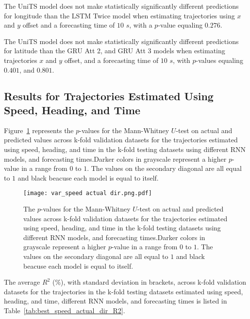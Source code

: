 The UniTS model does not make statistically significantly different predictions for longitude than the LSTM Twice model when estimating trajectories using $x$ and $y$ offset and a forecasting time of $10$ $s$, with a $p$-value equaling $0.276$.

The UniTS model does not make statistically significantly different predictions for latitude than the GRU Att 2, and GRU Att 3 models when estimating trajectories $x$ and $y$ offset, and a forecasting time of $10$ $s$, with $p$-values equaling $0.401$, and $0.801$.

\subsection{Results for Trajectories Estimated Using Speed, Heading, and Time}

Figure~\ref{fig:var_speed actual dir.png} represents the $p$-values for the Mann-Whitney $U$-test on actual and predicted values across k-fold validation datasets for the trajectories estimated using speed, heading, and time in the k-fold testing datasets using different RNN models, and forecasting times.Darker colors in grayscale represent a higher $p$-value in a range from $0$ to $1$. The values on the secondary diagonal are all equal to $1$ and black beacuse each model is equal to itself.

\begin{figure}[!ht]
	\centering
	\texttt{[image: var\_speed actual dir.png.pdf]}
	\caption{The $p$-values for the Mann-Whitney $U$-test on actual and predicted values across k-fold validation datasets for the trajectories estimated using speed, heading, and time in the k-fold testing datasets using different RNN models, and forecasting times.Darker colors in grayscale represent a higher $p$-value in a range from $0$ to $1$. The values on the secondary diagonal are all equal to $1$ and black beacuse each model is equal to itself.}
	\label{fig:var_speed actual dir.png}
\end{figure}

The average $R^{2}$ (\%), with standard deviation in brackets, across k-fold validation datasets for the trajectories in the k-fold testing datasets estimated using speed, heading, and time, different RNN models, and forecasting times is listed in Table~\ref{tab:best_speed_actual_dir_R2}.

